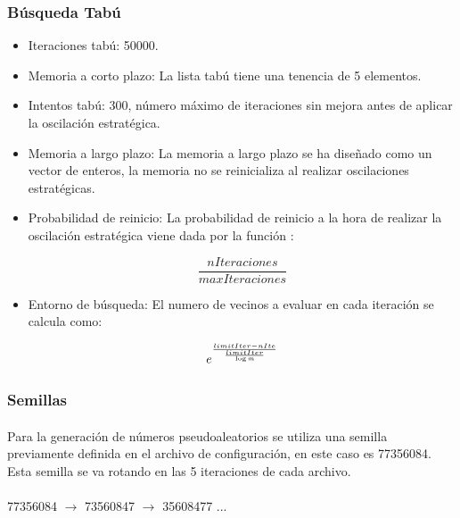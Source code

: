 \documentclass{article}
\begin{document}
	
		\subsubsection{Búsqueda Tabú}
		
			\begin{itemize}
				
				\item Iteraciones tabú: 50000.
				
				\item Memoria a corto plazo: La lista tabú tiene una tenencia de 5 elementos.
				
				\item Intentos tabú: 300, número máximo de iteraciones sin mejora antes de aplicar la oscilación estratégica.
				
				\item Memoria a largo plazo: La memoria a largo plazo se ha diseñado como un vector de enteros, la memoria no se reinicializa al realizar oscilaciones estratégicas.
				
				\item Probabilidad de reinicio: La probabilidad de reinicio a la hora de realizar la oscilación estratégica viene dada por la función :
				
				\[ \frac{nIteraciones}{maxIteraciones} \]
				
				\item Entorno de búsqueda: El numero de vecinos a evaluar en cada iteración se calcula como:
				
				\[ e^{\frac{limitIter - nIte}{ \frac{limitIter}{\log{\emph{m}}}}}\]
					
			\end{itemize}
	
	\subsubsection{Semillas}
	
	\paragraph{}Para la generación de números pseudoaleatorios se utiliza una semilla previamente definida en el archivo de configuración, en este caso es 77356084. Esta semilla se va rotando en las 5 iteraciones de cada archivo.
	
	
	\paragraph{} 77356084 $\rightarrow$ 73560847 $\rightarrow$ 35608477  ...
	
\end{document}
